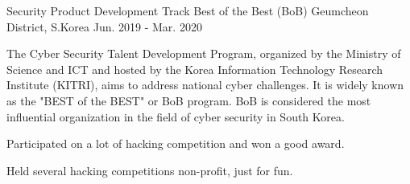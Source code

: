 

\begin{cventries}

  \cventry
    {Security Product Development Track} %
    {Best of the Best (BoB)} %
    {Geumcheon District, S.Korea} %
    {Jun. 2019 - Mar. 2020} %
    {
      \begin{cvitems} %
        \item {The Cyber Security Talent Development Program, organized by the Ministry of Science and ICT and hosted by the Korea Information Technology Research Institute (KITRI), aims to address national cyber challenges. It is widely known as the "BEST of the BEST" or BoB program. BoB is considered the most influential organization in the field of cyber security in South Korea.}
        \item {Participated on a lot of hacking competition and won a good award.}
        \item {Held several hacking competitions non-profit, just for fun.}
      \end{cvitems}
    }

\end{cventries}

